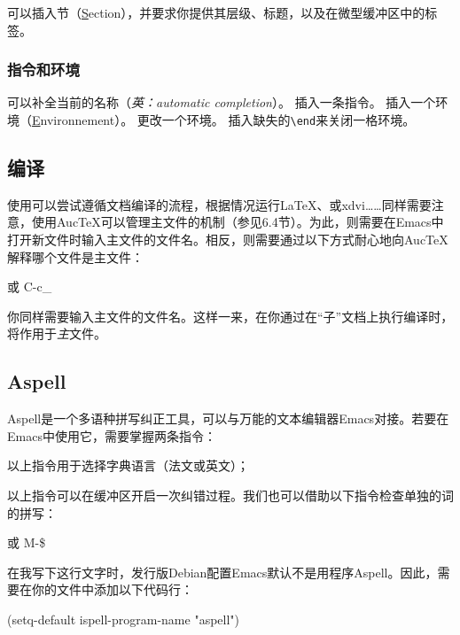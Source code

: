可以插入节（\underline{S}ection），并要求你提供其层级、标题，以及在微型缓冲区中的标签。%

\subsubsection{指令和环境}

可以补全当前的名称（\emph{英：automatic completion}）。
插入一条指令。
插入一个环境（\underline{E}nvironnement）。
更改一个环境。
\fbox{\dm{C-c ]}}插入缺失的\verb+\end+来关闭一格环境。

\subsection{编译}

使用可以尝试遵循文档编译的流程，根据情况运行\LaTeX 、\bib 或\textsf{xdvi}……同样需要注意，使用Auc\TeX 可以管理主文件的机制（参见6.4节）。为此，则需要在\textsf{Emacs}中打开新文件时输入主文件的文件名。相反，则需要通过以下方式耐心地向Auc\TeX 解释哪个文件是主文件：

\textrm{ 或 }\textsf{C-c\_}%

你同样需要输入主文件的文件名。这样一来，在你通过在``子''文档上执行编译时，将作用于\emph{主}文件。

\subsection{Aspell}

\textsf{Aspell}是一个多语种拼写纠正工具，可以与万能的文本编辑器\textsf{Emacs}对接。若要在\textsf{Emacs}中使用它，需要掌握两条指令：


以上指令用于选择字典语言（法文或英文）；


以上指令可以在缓冲区开启一次纠错过程。我们也可以借助以下指令检查单独的词的拼写：

\textrm{或 }\textsf{M-\$}

\begin{exclamation}
在我写下这行文字时，发行版Debian配置Emacs默认不是用程序Aspell。因此，需要在你的文件中添加以下代码行：

\begin{dmd}
(setq-default ispell-program-name "aspell")
\end{dmd}
\end{exclamation}

